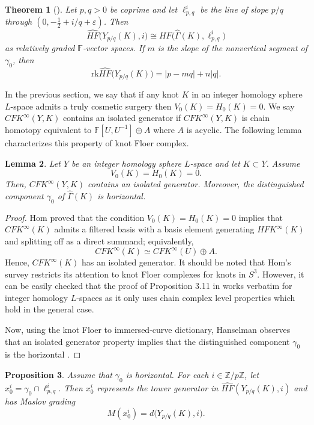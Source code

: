\documentclass[12pt]{amsart}
\newtheorem{theorem}{Theorem}[section]
\newtheorem{lemma}[theorem]{Lemma}
\newtheorem{proposition}[theorem]{Proposition}
\theoremstyle{definition}
\theoremstyle{definition}
\newcommand{\F}{{\mathbb{F}}}
\newcommand{\Z}{{\mathbb{Z}}}
\newcommand{\CFKINFTY}{{CFK}^{\infty}}
\newcommand{\HFKINFTY}{{HFK}^{\infty}}
\newcommand{\HFhat}{\widehat{HF}}
\newcommand{\rk}{\text{rk}}
\newcommand{\Gh}{\widehat{\Gamma}}
\newcommand{\din}{d}
\begin{document}
\begin{theorem}[{\cite{HRW1,HRW2}}]\label{thm:surgery-immersed}
Let $p,q>0$ be coprime and let $\ell^i_{p,q}$ be the line of slope $p/q$ through
$(0,-\tfrac12+i/q+\varepsilon)$.  Then
\[
\HFhat\bigl(Y_{p/q}(K),i\bigr) \cong HF\bigl(\Gh(K),\ell^i_{p,q}\bigr)
\]
as relatively graded $\F$-vector spaces.  If $m$ is the slope of the
nonvertical segment of $\gamma_0$, then
\[
\rk\HFhat\bigl(Y_{p/q}(K)\bigr)=|p-mq|+n|q|.
\]
\end{theorem}

In the previous section, we say that if any knot $K$ in an integer homology sphere $L$-space admits a truly cosmetic surgery then $V_0(K)=H_0(K)=0$. We say $\CFKINFTY(Y,K)$ contains an isolated generator if   $\CFKINFTY(Y,K)$ is chain homotopy equivalent to $\F[U,U^{-1}]\oplus A$
where $A$ is acyclic. The following lemma characterizes this property of knot Floer complex.
\begin{lemma}\label{lem:isolated-gen}
Let $Y$ be an integer homology sphere $L$-space and let $K\subset Y$.
Assume
\[
        V_0(K)=H_0(K)=0.
\]
Then, $\CFKINFTY(Y,K)$ contains an isolated generator. Moreover, the distinguished component $\gamma_0$ of $\Gh(K)$ is horizontal.

\end{lemma}


\begin{proof}
    Hom \cite[Proposition 3.11]{Hom17} proved that the condition $V_0(K)=H_0(K)=0$ implies that $\CFKINFTY(K)$ admits a filtered basis
   with a basis element generating $\HFKINFTY(K)$ and splitting off as a
direct summand; equivalently,
\[
        \CFKINFTY(K)\simeq \CFKINFTY(U)\oplus A.
\] Hence, $\CFKINFTY(K)$ has an isolated generator. It should be noted that Hom's survey restricts its attention to knot Floer complexes for knots in $S^3$. However, it can be easily checked that the proof of Proposition 3.11 in \cite{Hom17} works verbatim for integer homology $L$-spaces as it only uses chain complex level properties which hold in the general case.

Now, using the knot Floer to immersed-curve dictionary, Hanselman observes that an isolated generator property implies that the distinguished component $\gamma_0$ is the horizontal \cite[Section~2.2]{Han}.
\end{proof}

\begin{proposition}\label{prop:gamma0-d-invariant}
Assume that $\gamma_0$ is horizontal.  For each $i\in\Z/p\Z$, let
$x_0^i=\gamma_0\cap \ell^i_{p,q}$.  Then $x_0^i$ represents the tower generator
in $\HFhat(Y_{p/q}(K),i)$ and has Maslov grading
\[
M(x_0^i)=\din\bigl(Y_{p/q}(K),i\bigr).
\]
\end{proposition}
\end{document}
